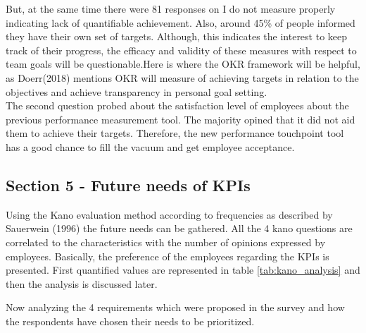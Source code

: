 But, at the same time there were 81 responses on I do not measure properly indicating lack of quantifiable achievement. Also, around 45\% of people informed they have their own set of targets. Although, this indicates the interest to keep track of their progress, the efficacy and validity of these measures with respect to team goals will be questionable.Here is where the OKR framework will be helpful, as Doerr(2018) mentions OKR will measure of achieving targets in relation to the objectives and achieve transparency in personal goal setting.\\  

The second question probed about the satisfaction level of employees about the previous performance measurement tool. The majority opined that it did not aid them to achieve their targets. Therefore, the new performance touchpoint tool has a good chance to fill the vacuum and get employee acceptance.\\

\subsection{Section 5 - Future needs of KPIs}
Using the Kano evaluation method according to frequencies as described by Sauerwein (1996) the future needs can be gathered. All the 4 kano questions are correlated to the characteristics with the number of opinions expressed by employees. Basically, the preference of the employees regarding the KPIs is presented. First quantified values are represented in table \ref{tab:kano_analysis} and then the analysis is discussed later.\\

\begin{table}[h]
    \centering
    \captionsetup{justification=centering, margin=2cm}
    \caption{kano Analysis}
   \label{tab:kano_analysis}
\end{table}
Now analyzing the 4 requirements which were proposed in the survey and how the respondents have chosen their needs to be prioritized.\\


